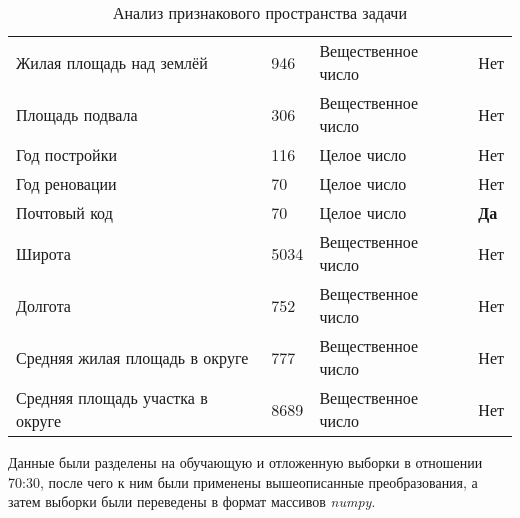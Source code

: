 \documentclass[a4paper, 14pt]{article}
\begin{document}
\begin{table}[]
\begin{tabular}{@{}llll@{}}
    Жилая площадь над землёй         & 946                                                                 & Вещественное число & Нет                    \\
    Площадь подвала                  & 306                                                                 & Вещественное число & Нет                    \\
    Год постройки                    & 116                                                                 & Целое число        & Нет                    \\
    Год реновации                    & 70                                                                  & Целое число        & Нет                    \\
    Почтовый код                     & 70                                                                  & Целое число        & \textbf{Да}                     \\
    Широта                           & 5034                                                                & Вещественное число & Нет                    \\
    Долгота                          & 752                                                                 & Вещественное число & Нет                    \\
    Средняя жилая площадь в округе   & 777                                                                 & Вещественное число & Нет                    \\
    Средняя площадь участка в округе & 8689                                                                & Вещественное число & Нет                    \\ \bottomrule
    \end{tabular}
    \caption{Анализ признакового пространства задачи}\label{features}
    \end{table}

    Данные были разделены на обучающую и отложенную выборки в отношении 70:30, после чего к ним были применены вышеописанные преобразования, а затем выборки были переведены в формат массивов \textit{numpy}.
\end{document}
